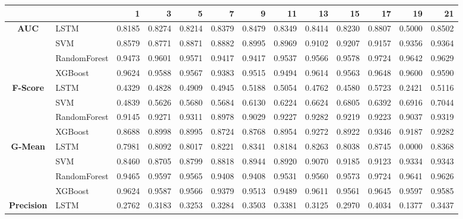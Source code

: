 \begin{table}[h]
	\centering
	\begin{adjustbox}{max width=15cm}
		\begin{tabular}{|c|l|r|r|r|r|r|r|r|r|r|r|r|}
			\hline
			&         &      1  &      3  &      5  &      7  &      9  &      11 &      13 &      15 &      17 &      19 &      21 \\
			\hline
			\textbf{AUC} & LSTM &  0.8185 &  0.8274 &  0.8214 &  0.8379 &  0.8479 &  0.8349 &  0.8414 &  0.8230 &  0.8807 &  0.5000 &  0.8502 \\
			& SVM &  0.8579 &  0.8771 &  0.8871 &  0.8882 &  0.8995 &  0.8969 &  0.9102 &  0.9207 &  0.9157 &  0.9356 &  0.9364 \\
			& RandomForest &  0.9473 &  0.9601 &  0.9571 &  0.9417 &  0.9417 &  0.9537 &  0.9566 &  0.9578 &  0.9724 &  0.9642 &  0.9629 \\
			& XGBoost &  0.9624 &  0.9588 &  0.9567 &  0.9383 &  0.9515 &  0.9494 &  0.9614 &  0.9563 &  0.9648 &  0.9600 &  0.9590 \\
			\hline
			\textbf{F-Score} & LSTM &  0.4329 &  0.4828 &  0.4909 &  0.4945 &  0.5188 &  0.5054 &  0.4762 &  0.4580 &  0.5723 &  0.2421 &  0.5116 \\
			& SVM &  0.4839 &  0.5626 &  0.5680 &  0.5684 &  0.6130 &  0.6224 &  0.6624 &  0.6805 &  0.6392 &  0.6916 &  0.7044 \\
			& RandomForest &  0.9145 &  0.9271 &  0.9311 &  0.8978 &  0.9029 &  0.9227 &  0.9282 &  0.9219 &  0.9223 &  0.9037 &  0.9319 \\
			& XGBoost &  0.8688 &  0.8998 &  0.8995 &  0.8724 &  0.8768 &  0.8954 &  0.9272 &  0.8922 &  0.9346 &  0.9187 &  0.9282 \\
			\hline
			\textbf{G-Mean} & LSTM &  0.7981 &  0.8092 &  0.8017 &  0.8221 &  0.8341 &  0.8184 &  0.8263 &  0.8038 &  0.8745 &  0.0000 &  0.8368 \\
			& SVM &  0.8460 &  0.8705 &  0.8799 &  0.8818 &  0.8944 &  0.8920 &  0.9070 &  0.9185 &  0.9123 &  0.9334 &  0.9343 \\
			& RandomForest &  0.9465 &  0.9597 &  0.9565 &  0.9408 &  0.9408 &  0.9531 &  0.9560 &  0.9573 &  0.9724 &  0.9641 &  0.9626 \\
			& XGBoost &  0.9624 &  0.9587 &  0.9566 &  0.9379 &  0.9513 &  0.9489 &  0.9611 &  0.9561 &  0.9645 &  0.9597 &  0.9585 \\
			\hline
			\textbf{Precision} & LSTM &  0.2762 &  0.3183 &  0.3253 &  0.3284 &  0.3503 &  0.3381 &  0.3125 &  0.2970 &  0.4034 &  0.1377 &  0.3437 \\

\end{tabular}
\end{adjustbox}
\end{table}
